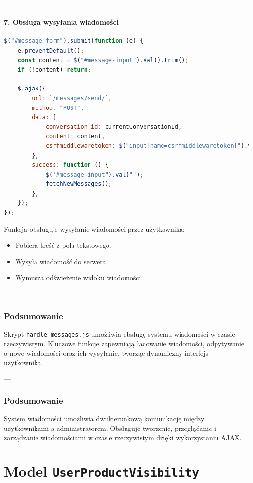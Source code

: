 \documentclass[12pt,a4paper,oneside]{article}
\theoremstyle{definition}
\numberwithin{equation}{section}
\begin{document}
---

\paragraph{7. Obsługa wysyłania wiadomości}
\begin{lstlisting}[language=JavaScript, caption=Wysyłanie wiadomości]
$("#message-form").submit(function (e) {
    e.preventDefault();
    const content = $("#message-input").val().trim();
    if (!content) return;

    $.ajax({
        url: `/messages/send/`,
        method: "POST",
        data: {
            conversation_id: currentConversationId,
            content: content,
            csrfmiddlewaretoken: $("input[name=csrfmiddlewaretoken]").val(),
        },
        success: function () {
            $("#message-input").val("");
            fetchNewMessages();
        },
    });
});
\end{lstlisting}
Funkcja obsługuje wysyłanie wiadomości przez użytkownika:
\begin{itemize}
    \item Pobiera treść z pola tekstowego.
    \item Wysyła wiadomość do serwera.
    \item Wymusza odświeżenie widoku wiadomości.
\end{itemize}

---

\subsubsection{Podsumowanie}
Skrypt \texttt{handle\_messages.js} umożliwia obsługę systemu wiadomości w czasie rzeczywistym. Kluczowe funkcje zapewniają ładowanie wiadomości, odpytywanie o nowe wiadomości oraz ich wysyłanie, tworząc dynamiczny interfejs użytkownika.

---

\subsubsection{Podsumowanie}
System wiadomości umożliwia dwukierunkową komunikację między użytkownikami a administratorem. Obsługuje tworzenie, przeglądanie i zarządzanie wiadomościami w czasie rzeczywistym dzięki wykorzystaniu AJAX.


% 
% 


\section{Model \texttt{UserProductVisibility}}
\end{document}

